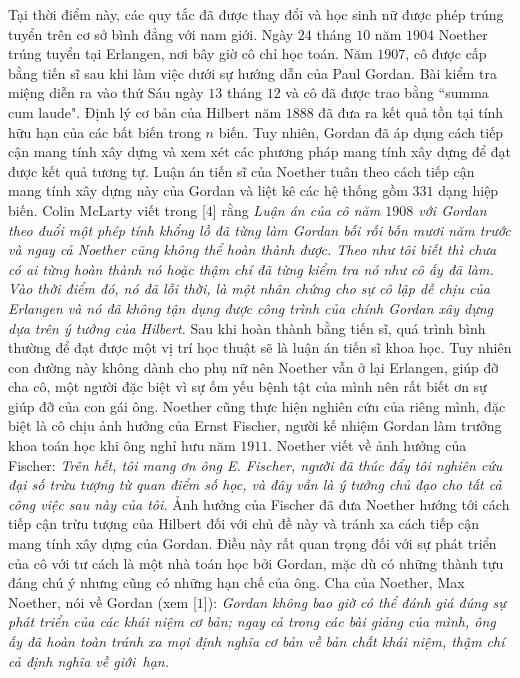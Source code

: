 \begin{multicols}{2}
	\vskip 0.05cm
	Tại thời điểm này, các quy tắc đã được thay đổi và học sinh nữ được phép trúng tuyển trên cơ sở bình đẳng với nam giới. Ngày $24$ tháng $10$ năm $1904$ Noether trúng tuyển tại Erlangen, nơi bây giờ cô chỉ học toán. Năm $1907$, cô được cấp bằng tiến sĩ sau khi làm việc dưới sự hướng dẫn của Paul Gordan. Bài kiểm tra miệng diễn ra vào thứ Sáu ngày $13$ tháng $12$ và cô đã được trao bằng ``summa cum laude". Định lý cơ bản của Hilbert năm $1888$ đã đưa ra kết quả tồn tại tính hữu hạn của các bất biến trong $n$ biến. Tuy nhiên, Gordan đã áp dụng cách tiếp cận mang tính xây dựng và xem xét các phương pháp mang tính xây dựng để đạt được kết quả tương tự. Luận án tiến sĩ của Noether tuân theo cách tiếp cận mang tính xây dựng này của Gordan và liệt kê các hệ thống gồm $331$ dạng hiệp biến. Colin McLarty viết trong [$4$] rằng
	\vskip 0.05cm
	\textit{Luận án của cô năm $1908$ với Gordan theo đuổi một phép tính khổng lồ đã từng làm Gordan bối rối bốn mươi năm trước và ngay cả Noether cũng không thể hoàn thành được. Theo như tôi biết thì chưa có ai từng hoàn thành nó hoặc thậm chí đã từng kiểm tra nó như cô ấy đã làm. Vào thời điểm đó, nó đã lỗi thời, là một nhân chứng cho sự cô lập dễ chịu của Erlangen và  nó đã không tận dụng được công trình của chính Gordan xây dựng dựa trên ý tưởng của Hilbert.}
	\vskip 0.05cm
	Sau khi hoàn thành bằng tiến sĩ, quá trình bình thường để đạt được một vị trí học thuật sẽ là luận án tiến sĩ khoa học. Tuy nhiên con đường này không dành cho phụ nữ nên Noether vẫn ở lại Erlangen, giúp đỡ cha cô, một người đặc biệt vì sự ốm yếu bệnh tật của mình nên rất biết ơn sự giúp đỡ của con gái ông. Noether cũng thực hiện nghiên cứu của riêng mình, đặc biệt là cô chịu ảnh hưởng của Ernst Fischer, người kế nhiệm Gordan làm trưởng khoa toán học khi ông nghỉ hưu năm $1911$. Noether viết về ảnh hưởng của Fischer:
	\vskip 0.05cm
	\textit{Trên hết, tôi mang ơn ông E. Fischer, người đã thúc đẩy tôi nghiên cứu đại số trừu tượng từ quan điểm số học, và đây vẫn là ý tưởng chủ đạo cho tất cả công việc sau này của tôi.}
	\vskip 0.05cm
	Ảnh hưởng của Fischer đã đưa Noether hướng tới cách tiếp cận trừu tượng của Hilbert đối với chủ đề này và tránh xa cách tiếp cận mang tính xây dựng của Gordan. Điều này rất quan trọng đối với sự phát triển của cô với tư cách là một nhà toán học bởi  Gordan, mặc dù có những thành tựu đáng chú ý nhưng cũng có những hạn chế của ông. Cha của Noether, Max Noether, nói về Gordan (xem [$1$]):
	\vskip 0.05cm
	\textit{Gordan không bao giờ có thể đánh giá đúng sự phát triển của các khái niệm cơ bản; ngay cả trong các bài giảng của mình, ông ấy đã hoàn toàn tránh xa mọi định nghĩa cơ bản về bản chất khái niệm, thậm chí cả định nghĩa về giới~hạn.}

\end{multicols}
